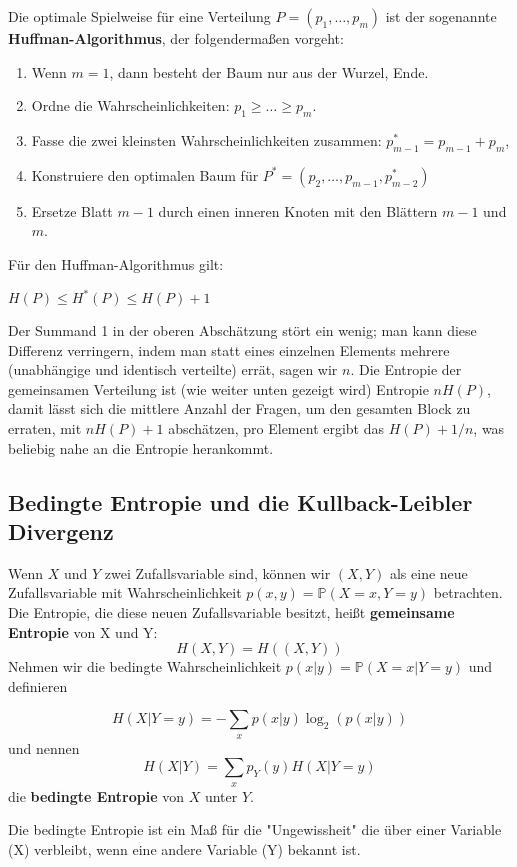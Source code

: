 \begin{definition}\label{def:huffman_algorithmus}
Die optimale Spielweise für eine Verteilung $P=(p_1,\dots, p_m)$ ist der sogenannte \textbf{Huffman-Algorithmus}, der folgendermaßen vorgeht:

\begin{enumerate}
\item Wenn $m=1$, dann besteht der Baum nur aus der Wurzel, Ende.
\item Ordne die Wahrscheinlichkeiten: $p_1\ge\dots\ge p_m$.
\item Fasse die zwei kleinsten Wahrscheinlichkeiten zusammen: 
$p^*_{m-1}=p_{m-1}+p_m$,
\item Konstruiere den optimalen Baum für $P^*=(p_2,\dots,p_{m-1},p_{m-2}^*)$
\item Ersetze Blatt $m-1$ durch einen inneren Knoten mit den Blättern
$m-1$ und $m$.
\end{enumerate}
\end{definition}
Für den Huffman-Algorithmus gilt:
\begin{satz} %
$H(P) \leq H^*(P) \leq H(P) +1$
\end{satz}

Der Summand 1 in der oberen Abschätzung stört ein wenig; man kann
diese Differenz verringern, indem man statt eines einzelnen
Elements mehrere (unabhängige und identisch verteilte) errät, sagen wir $n$.
Die Entropie der gemeinsamen Verteilung ist (wie weiter unten
gezeigt wird) Entropie $nH(P)$, damit lässt sich die mittlere Anzahl der
Fragen, um den gesamten Block zu erraten, mit $nH(P)+1$
abschätzen, pro Element ergibt das $H(P)+1/n$, was beliebig nahe an
die Entropie herankommt.


\subsection{Bedingte Entropie und die Kullback-Leibler Divergenz}
Wenn $X$ und $Y$ zwei Zufallsvariable sind, können wir $(X,Y)$
als eine neue Zufallsvariable mit Wahrscheinlichkeit $p(x, y)=\mathbb P(X=x, Y=y)$ betrachten.\\
Die Entropie, die diese neuen Zufallsvariable besitzt, heißt  \textbf{gemeinsame Entropie} von X und Y:\\
 \[H(X,Y)=H((X,Y))\]
Nehmen wir die bedingte Wahrscheinlichkeit
$p(x|y)=\mathbb P(X=x|Y=y)$ und definieren
\begin{definition}
\[H(X|Y=y)=-\sum_x p(x|y)\log_2(p(x|y))\]
und nennen
\[H(X|Y)=\sum_x p_Y(y)H(X|Y=y)\]
die \textbf{bedingte Entropie} von $X$ unter $Y$.
\end{definition}
Die bedingte Entropie ist ein Maß für die "Ungewissheit" die über einer Variable (X) verbleibt, wenn eine andere Variable (Y) bekannt ist.\\

